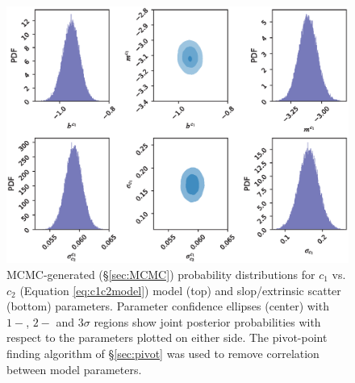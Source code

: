 \begin{figure}
    \centering
    \includegraphics[width=1.0\linewidth]{figures/c1c2_params.eps}
    \caption{MCMC-generated (\S\ref{sec:MCMC}) probability distributions for $c_1$ vs. $c_2$ (Equation \eqref{eq:c1c2model}) model (top) and slop/extrinsic scatter (bottom) parameters. Parameter confidence ellipses (center) with $1-$, $2-$ and $3\sigma$ regions show joint posterior probabilities with respect to the parameters plotted on either side. The pivot-point finding algorithm of  \S\ref{sec:pivot} was used to remove correlation between model parameters.}
    \label{fig:c1c2_params}
\end{figure}

